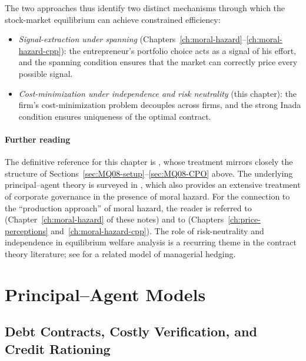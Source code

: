 \documentclass[11pt,a4paper,oneside]{book}
\theoremstyle{plain}
\theoremstyle{definition}
\theoremstyle{remark}
\numberwithin{equation}{chapter}
\begin{document}
The two approaches thus identify two distinct mechanisms through which the stock-market equilibrium can achieve constrained efficiency:
\begin{itemize}
  \item \emph{Signal-extraction under spanning} (Chapters~\ref{ch:moral-hazard}--\ref{ch:moral-hazard-cpp}): the entrepreneur's portfolio choice acts as a signal of his effort, and the spanning condition ensures that the market can correctly price every possible signal.
  \item \emph{Cost-minimization under independence and risk neutrality} (this chapter): the firm's cost-minimization problem decouples across firms, and the strong Inada condition ensures uniqueness of the optimal contract.
\end{itemize}

\subsection{Further reading}

The definitive reference for this chapter is \citet{MagillQuinzii2008}, whose treatment mirrors closely the structure of Sections~\ref{sec:MQ08-setup}--\ref{sec:MQ08-CPO} above.
The underlying principal--agent theory is surveyed in \citet{Tirole2006}, which also provides an extensive treatment of corporate governance in the presence of moral hazard.
For the connection to the ``production approach'' of moral hazard, the reader is referred to \citet{MagillQuinzii2002} (Chapter~\ref{ch:moral-hazard} of these notes) and to \citet{BisinGottardiRuta2015} (Chapters~\ref{ch:price-perceptions} and~\ref{ch:moral-hazard-cpp}).
The role of risk-neutrality and independence in equilibrium welfare analysis is a recurring theme in the contract theory literature; see \citet{BisinGottardiRampini2008} for a related model of managerial hedging.


\part{Principal--Agent Models}


\chapter{Debt Contracts, Costly Verification, and Credit Rationing}
\label{ch:debt-rationing}
\end{document}
